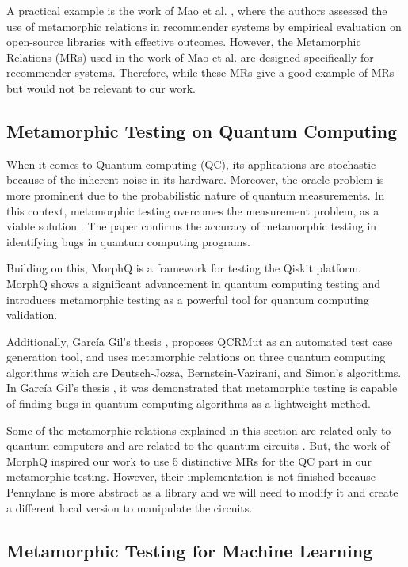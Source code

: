 \documentclass[12pt,a4paper]{article}
\begin{document}
	A practical example is the work of Mao et al. \cite{cmao2024}, where the authors assessed the use of metamorphic relations in recommender systems by empirical evaluation on open-source libraries with effective outcomes. However, the Metamorphic Relations (MRs) used in the work of Mao et al. \cite{cmao2024} are designed specifically for recommender systems. Therefore, while these MRs give a good example of MRs but would not be relevant to our work.
	
	\subsection{Metamorphic Testing on Quantum Computing}
	
	When it comes to Quantum computing (QC), its applications are stochastic because of the inherent noise in its hardware. Moreover, the oracle problem is more prominent due to the probabilistic nature of quantum measurements. In this context, metamorphic testing overcomes the measurement problem, as a viable solution \cite{rabreu2022}. The paper confirms the accuracy of metamorphic testing in identifying bugs in quantum computing programs. 
	
	Building on this, \cite{Paltenghi2023} MorphQ is a framework for testing the Qiskit platform. MorphQ shows a significant advancement in quantum computing testing and introduces metamorphic testing as a powerful tool for quantum computing validation. 
	
	Additionally, García Gil’s thesis \cite{gracia2024}, proposes QCRMut as an automated test case generation tool, and uses metamorphic relations on three quantum computing algorithms which are Deutsch-Jozsa, Bernstein-Vazirani, and Simon’s algorithms. In García Gil’s thesis \cite{gracia2024}, it was demonstrated that metamorphic testing is capable of finding bugs in quantum computing algorithms as a lightweight method.
	
	Some of the metamorphic relations explained in this section are related only to quantum computers and are related to the quantum circuits \cite{rabreu2022} \cite{gracia2024}. But, the work of MorphQ \cite{Paltenghi2023} inspired our work to use 5 distinctive MRs for the QC part in our metamorphic testing. However, their implementation is not finished because Pennylane is more abstract as a library and we will need to modify it and create a different local version to manipulate the circuits.
	
	\subsection{Metamorphic Testing for Machine Learning}
	
\end{document}
